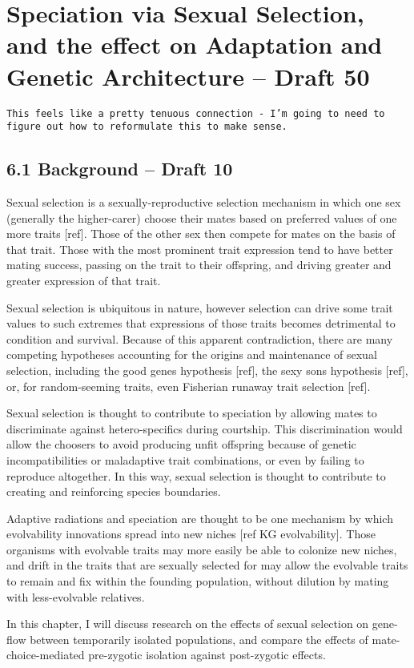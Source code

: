 \section{Speciation via Sexual Selection, and the effect on Adaptation and Genetic Architecture – Draft 50}

\verb|This feels like a pretty tenuous connection - I’m going to need to figure out how to reformulate this to make sense.|

\subsection{6.1 Background – Draft 10}

Sexual selection is a sexually-reproductive selection mechanism in which one sex (generally the higher-carer) choose their mates based on preferred values of one more traits [ref]. Those of the other sex then compete for mates on the basis of that trait. Those with the most prominent trait expression tend to have better mating success, passing on the trait to their offspring, and driving greater and greater expression of that trait. 

Sexual selection is ubiquitous in nature, however selection can drive some trait values to such extremes that expressions of those traits becomes detrimental to condition and survival. Because of this apparent contradiction, there are many competing hypotheses accounting for the origins and maintenance of sexual selection, including the good genes hypothesis [ref], the sexy sons hypothesis [ref], or, for random-seeming traits, even Fisherian runaway trait selection [ref]. 

Sexual selection is thought to contribute to speciation by allowing mates to discriminate against hetero-specifics during courtship. This discrimination would allow the choosers to avoid producing unfit offspring because of genetic incompatibilities or maladaptive trait combinations, or even by failing to reproduce altogether. In this way, sexual selection is thought to contribute to creating and reinforcing species boundaries.

Adaptive radiations and speciation are thought to be one mechanism by which evolvability innovations spread into new niches [ref KG evolvability]. Those organisms with evolvable traits may more easily be able to colonize new niches, and drift in the traits that are sexually selected for may allow the evolvable traits to remain and fix within the founding population, without dilution by mating with less-evolvable relatives. 

In this chapter, I will discuss research on the effects of sexual selection on gene-flow between temporarily isolated populations, and compare the effects of mate-choice-mediated pre-zygotic isolation against post-zygotic effects.
